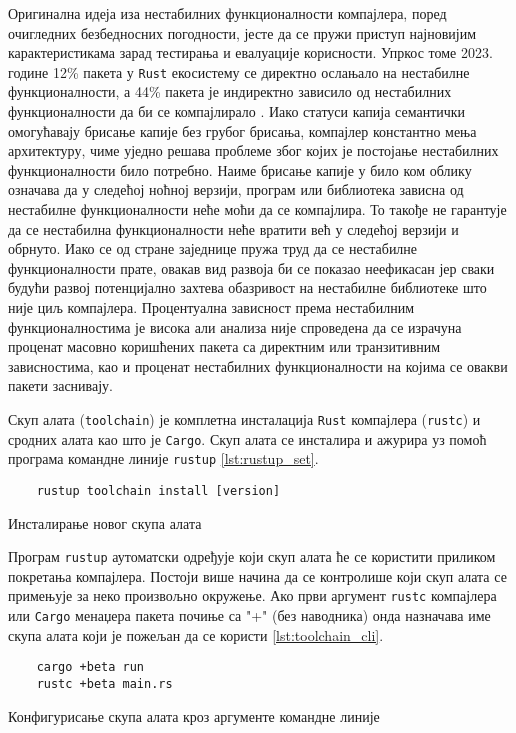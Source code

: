 Оригинална идеја иза нестабилних функционалности компајлера, поред очигледних безбедносних погодности, 
јесте да се пружи приступ најновијим карактеристикама зарад тестирања и евалуације корисности.
Упркос томе 2023. године 12\%  пакета у \verb|Rust| екосистему се директно ослањало на нестабилне функционалности, а 
44\% пакета је индиректно зависило од нестабилних функционалности да би се компајлирало \cite{unstable-flags}. Иако 
статуси капија семантички омогућавају брисање капије без грубог брисања, компајлер константно мења архитектуру, чиме уједно 
решава проблеме због којих је постојање нестабилних функционалности било потребно. Наиме брисање капије 
у било ком облику означава да у следећој ноћној верзији, програм или библиотека зависна од нестабилне функционалности
неће моћи да се компајлира. То такође не гарантује да се нестабилна функционалности неће вратити већ у следећој
верзији и обрнуто. Иако се од стране заједнице пружа труд да се нестабилне функционалности прате, овакав вид 
развоја би се показао неефикасан јер сваки будући развој потенцијално захтева обазривост на нестабилне 
библиотеке што није циљ компајлера. Процентуална зависност према нестабилним функционалностима је висока али 
анализа није спроведена да се израчуна проценат масовно коришћених пакета са директним или транзитивним
зависностима, као и проценат нестабилних функционалности на којима се овакви пакети заснивају.

Скуп алата (\verb|toolchain|) је комплетна инсталација \verb|Rust| компајлера (\verb|rustc|) и сродних алата као што 
је \verb|Cargo|. Скуп алата се инсталира и ажурира уз помоћ програма командне линије \verb|rustup| \ref{lst:rustup_set}. 

\begin{listing}[H]
\begin{verbatim}
    rustup toolchain install [version]
\end{verbatim}
\caption{Инсталирање новог скупа алата}
\label{lst:rustup_set}
\end{listing}

Програм \verb|rustup| аутоматски одређује који скуп алата ће се користити приликом покретања компајлера. 
Постоји више начина да се контролише који скуп алата се примењује за неко произвољно окружење.
Ако први аргумент \verb|rustc| компајлера или \verb|Cargo| менаџера пакета почиње са "+" (без наводника) 
онда назначава име скупа алата који је пожељан да се користи \ref{lst:toolchain_cli}. 

\begin{listing}[H]
\begin{verbatim}
    cargo +beta run 
    rustc +beta main.rs
\end{verbatim}
\caption{Конфигурисање скупа алата кроз аргументе командне линије}
\label{lst:toolchain_cli}
\end{listing}

